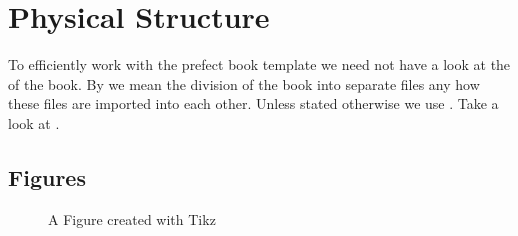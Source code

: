 \documentclass[crop=false,class=scrbook]{standalone}
\begin{document}
\chapter{Physical Structure}
To efficiently work with the prefect book template we need not have a look at
the  of the book.
By  we mean the division of the book into separate files any how these
files are imported into each other.
Unless stated otherwise we use .
Take a look at .

\cleardoublepage
\section{Figures}
\begin{figure}[h]
	
	\caption{A Figure created with Tikz}
	\label{fig:figure1}
\end{figure}
\end{document}
